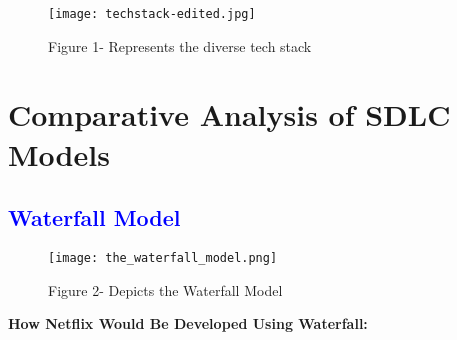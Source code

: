 \documentclass[a4paper,10pt,twoside]{article}
\begin{document}
\begin{figure}[tbhp]
\centering
\texttt{[image: techstack-edited.jpg]}
\caption{Figure 1- Represents the diverse tech stack}
\label{fig:techstack}
\end{figure}
\newpage

\section{Comparative Analysis of SDLC Models}
\subsection{\textcolor{Blue}{Waterfall Model}}
\begin{figure}[tbhp]
\centering
\texttt{[image: the\_waterfall\_model.png]}
\caption{Figure 2- Depicts the Waterfall Model}
\label{fig:waterfall}
\end{figure}
\textbf{How Netflix Would Be Developed Using Waterfall:}
\end{document}
